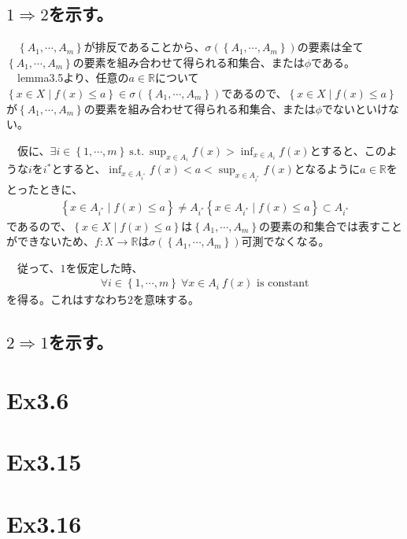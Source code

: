 \documentclass{article}
\begin{document}
\subsection{$1\Rightarrow 2$を示す。}
　$\left\{ A_1, \cdots, A_m\right\}$が排反であることから、$\sigma\left( \left\{ A_1, \cdots, A_m\right\} \right)$の要素は全て$\left\{ A_1, \cdots, A_m\right\}$の要素を組み合わせて得られる和集合、または$\phi$である。
　lemma3.5より、任意の$a\in \mathbb{R}$について$\left\{ x\in X\mid f(x)\leq a \right\} \in \sigma\left( \left\{ A_1, \cdots, A_m\right\} \right)$であるので、$\left\{ x\in X\mid f(x)\leq a \right\}$が$\left\{ A_1, \cdots, A_m\right\}$の要素を組み合わせて得られる和集合、または$\phi$でないといけない。

　仮に、$\exists i\in \left\{ 1,\cdots, m \right\}\ \text{s.t.}\ \sup_{x\in A_i} f(x) > \inf_{x\in A_i} f(x)$とすると、このような$i$を$i^{*}$とすると、$\inf_{x\in A_{i^{*}}} f(x) < a < \sup_{x\in A_{i^{*}}} f(x)$となるように$a\in \mathbb{R}$をとったときに、
\begin{align*}
	\left\{ x\in A_{i^{*}} \mid f(x)\leq a \right\} \neq A_{i^{*}}
	\left\{ x\in A_{i^{*}} \mid f(x)\leq a \right\} \subset A_{i^{*}}
\end{align*}
であるので、$\left\{ x\in X \mid f(x)\leq a \right\}$は$\left\{ A_1, \cdots, A_m\right\}$の要素の和集合では表すことができないため、$f:X\to \mathbb{R}$は$\sigma\left( \left\{ A_1, \cdots, A_m\right\} \right)$可測でなくなる。

　従って、$1$を仮定した時、
\begin{align*}
\forall i\in \left\{ 1, \cdots, m\right\}\ \forall x \in A_i\ f(x) \text{\ is constant}
\end{align*}
を得る。これはすなわち$2$を意味する。

\subsection{$2\Rightarrow 1$を示す。}

\section{Ex3.6}

\section{Ex3.15}

\section{Ex3.16}
\end{document}
